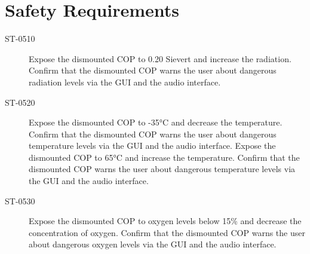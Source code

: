 \section{Safety Requirements}

\begin{description}
\item[ST-0510] Expose the dismounted COP to 0.20 Sievert and increase the radiation. Confirm that the dismounted COP warns the user about dangerous radiation levels via the GUI and the audio interface.
\item[ST-0520] Expose the dismounted COP to -35°C and decrease the temperature. Confirm that the dismounted COP warns the user about dangerous temperature levels via the GUI and the audio interface. Expose the dismounted COP to 65°C and increase the temperature. Confirm that the dismounted COP warns the user about dangerous temperature levels via the GUI and the audio interface.
\item[ST-0530] Expose the dismounted COP to oxygen levels below 15\% and decrease the concentration of oxygen. Confirm that the dismounted COP warns the user about dangerous oxygen levels via the GUI and the audio interface.
\end{description}